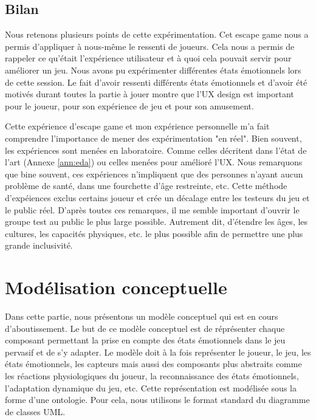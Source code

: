 \documentclass{article}
\begin{document}
	\subsection{Bilan}
		Nous retenons plusieurs points de cette expérimentation.
		Cet escape game nous a permis d'appliquer à nous-même le ressenti de joueurs.
		Cela nous a permis de rappeler ce qu'était l'expérience utilisateur et à quoi cela pouvait servir pour améliorer un jeu.
		Nous avons pu expérimenter différentes états émotionnels lors de cette session.
		Le fait d'avoir ressenti différents états émotionnels et d'avoir été motivés durant toutes la partie à jouer montre que l'UX design est important pour le joueur, pour son expérience de jeu et pour son amusement.\par
		Cette expérience d'escape game et mon expérience personnelle m'a fait comprendre l'importance de mener des expérimentation "en réel".
		Bien souvent, les expériences sont menées en laboratoire.
		Comme celles décritent dans l'état de l'art (Annexe \ref{ann:eda}) ou celles menées pour amélioré l'UX.
		Nous remarquons que bine souvent, ces expériences n'impliquent que des personnes n'ayant aucun problème de santé, dans une fourchette d'âge restreinte, etc.
		Cette méthode d'expéiences exclus certains joueur et crée un décalage entre les testeurs du jeu et le public réel.
		D'après toutes ces remarques, il me semble important d'ouvrir le groupe test au public le plus large possible.
		Autrement dit, d'étendre les âges, les cultures, les capacités physiques, etc. le plus possible afin de permettre une plus grande inclusivité.

\section{Modélisation conceptuelle}\label{sec:modelisation}
	Dans cette partie, nous présentons un modèle conceptuel qui est en cours d'aboutissement. 
	Le but de ce modèle conceptuel est de réprésenter chaque composant permettant la prise en compte des états émotionnels dans le jeu pervasif et de s'y adapter. 
	Le modèle doit à la fois représenter le joueur, le jeu, les états émotionnels, les capteurs mais aussi des composants plus abstraits comme les réactions physiologiques du joueur, la reconnaissance des états émotionnels, l'adaptation dynamique du jeu, etc. 
	Cette représentation est modélisée sous la forme d'une ontologie.
	Pour cela, nous utilisons le format standard du diagramme de classes UML.
\end{document}
